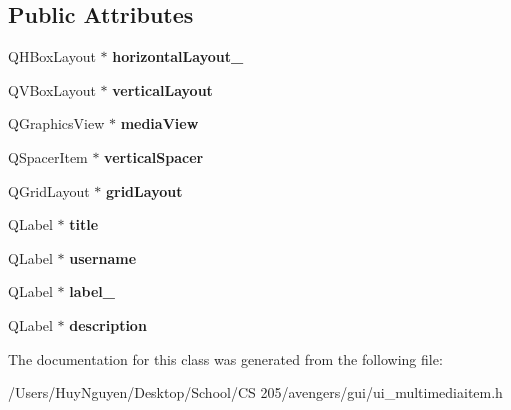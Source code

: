 \subsection*{Public Attributes}
\begin{DoxyCompactItemize}
\item 
Q\+H\+Box\+Layout $\ast$ {\bfseries horizontal\+Layout\+\_}\hypertarget{classUi__MultimediaItem_a0cf7d1b0b199e279a6b2ea2ce7c5ba24}{}\label{classUi__MultimediaItem_a0cf7d1b0b199e279a6b2ea2ce7c5ba24}

\item 
Q\+V\+Box\+Layout $\ast$ {\bfseries vertical\+Layout}\hypertarget{classUi__MultimediaItem_a07a124bed3d83f9b7d58c1776834dcfb}{}\label{classUi__MultimediaItem_a07a124bed3d83f9b7d58c1776834dcfb}

\item 
Q\+Graphics\+View $\ast$ {\bfseries media\+View}\hypertarget{classUi__MultimediaItem_ab3c86070c12b6d992dfa2a96be98e97e}{}\label{classUi__MultimediaItem_ab3c86070c12b6d992dfa2a96be98e97e}

\item 
Q\+Spacer\+Item $\ast$ {\bfseries vertical\+Spacer}\hypertarget{classUi__MultimediaItem_a48d3043eb7346d64c95d2b159349f732}{}\label{classUi__MultimediaItem_a48d3043eb7346d64c95d2b159349f732}

\item 
Q\+Grid\+Layout $\ast$ {\bfseries grid\+Layout}\hypertarget{classUi__MultimediaItem_a9588fb66e989bb30e27283487cd9ea6f}{}\label{classUi__MultimediaItem_a9588fb66e989bb30e27283487cd9ea6f}

\item 
Q\+Label $\ast$ {\bfseries title}\hypertarget{classUi__MultimediaItem_aaf76ef660a81b40d62809496a3fe8ef8}{}\label{classUi__MultimediaItem_aaf76ef660a81b40d62809496a3fe8ef8}

\item 
Q\+Label $\ast$ {\bfseries username}\hypertarget{classUi__MultimediaItem_a4071d4c6a3e0d834e692c8fb619e2e5d}{}\label{classUi__MultimediaItem_a4071d4c6a3e0d834e692c8fb619e2e5d}

\item 
Q\+Label $\ast$ {\bfseries label\+\_}\hypertarget{classUi__MultimediaItem_a1a6e73f3b9d7aca64830681c30dfd56c}{}\label{classUi__MultimediaItem_a1a6e73f3b9d7aca64830681c30dfd56c}

\item 
Q\+Label $\ast$ {\bfseries description}\hypertarget{classUi__MultimediaItem_ae8d4fd773383dc1e58ce16331c50e057}{}\label{classUi__MultimediaItem_ae8d4fd773383dc1e58ce16331c50e057}

\end{DoxyCompactItemize}


The documentation for this class was generated from the following file\+:\begin{DoxyCompactItemize}
\item 
/\+Users/\+Huy\+Nguyen/\+Desktop/\+School/\+C\+S 205/avengers/gui/ui\+\_\+multimediaitem.\+h\end{DoxyCompactItemize}
